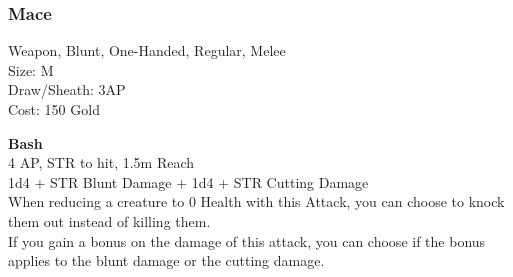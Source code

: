 \subsubsection{Mace}\label{weapon:mace}
Weapon, Blunt, One-Handed, Regular, Melee\\
Size: M\\
Draw/Sheath: 3AP\\
Cost: 150 Gold

\textbf{Bash}\\
4 AP, STR to hit, 1.5m Reach\\
1d4 + \texttimes STR Blunt Damage + 1d4 + \texttimes STR Cutting Damage\\
When reducing a creature to 0 Health with this Attack, you can choose to knock them out instead of killing them.\\
If you gain a bonus on the damage of this attack, you can choose if the bonus applies to the blunt damage or the cutting damage.